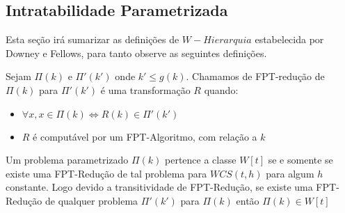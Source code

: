 \subsection{Intratabilidade Parametrizada}
Esta seção irá sumarizar as definições de $W-Hierarquia$ estabelecida por Downey e Fellows, para tanto observe as seguintes definições.
\begin{definition}
 Sejam $\Pi(k)$ e $\Pi'(k')$ onde $k' \leq g(k)$. Chamamos de FPT-redução de $\Pi(k)$ para $\Pi'(k')$ é uma transformação $R$ quando:
 \begin{itemize}
   \item $\forall x, x \in \Pi(k) \iff R(k) \in \Pi'(k')$
   \item $R$ é computável por um FPT-Algoritmo, com relação a $k$
 \end{itemize}
\end{definition}

\begin{definition}
 Um problema parametrizado $\Pi(k)$ pertence a classe $W[t]$ se e somente se existe uma FPT-Redução de tal problema para $WCS(t,h)$ para algum $h$ constante. Logo devido a transitividade de FPT-Redução, se existe uma FPT-Redução de qualquer problema $\Pi'(k')$ para $\Pi(k)$ então $\Pi(k) \in W[t]$
\end{definition}
